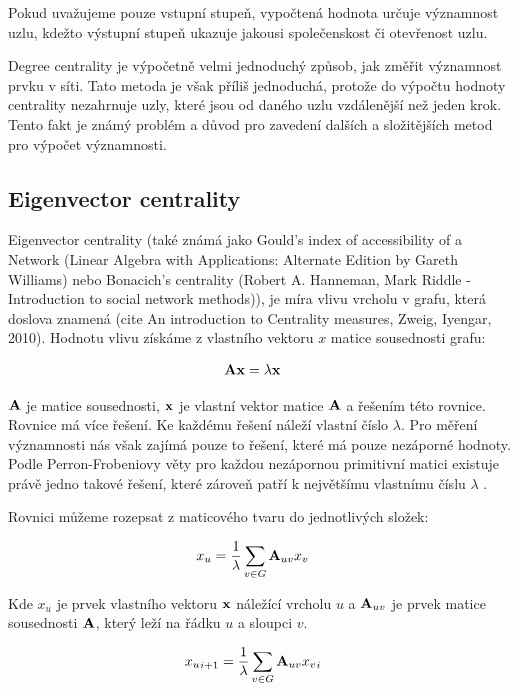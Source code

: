 \documentclass{bakalarka}
\begin{document}
Pokud uvažujeme pouze vstupní stupeň, vypočtená hodnota určuje významnost uzlu,
kdežto výstupní stupeň ukazuje jakousi společenskost či otevřenost uzlu. 

Degree centrality je výpočetně velmi jednoduchý způsob, jak změřit významnost
prvku v síti. Tato metoda je však příliš jednoduchá, protože do výpočtu hodnoty
centrality nezahrnuje uzly, které jsou od daného uzlu vzdálenější než jeden
krok. Tento fakt je známý problém a důvod pro zavedení dalších a složitějších
metod pro výpočet významnosti.



\subsection{Eigenvector centrality}
Eigenvector centrality (také známá jako Gould's index of accessibility of a
Network (Linear Algebra with Applications: Alternate Edition by Gareth
Williams) nebo Bonacich's centrality (Robert A. Hanneman, Mark Riddle -
Introduction to social network methods)), je míra vlivu vrcholu v grafu, která
doslova znamená  (cite An introduction to
Centrality measures, Zweig, Iyengar, 2010). Hodnotu vlivu získáme z vlastního
vektoru $x$ matice sousednosti grafu:

\begin{align}
{\bf Ax} &= \lambda {\bf x}
\end{align}

${\bf A}$ je matice sousednosti, ${\bf x}$ je vlastní vektor matice ${\bf A}$ a
řešením této rovnice. Rovnice má více řešení. Ke každému řešení náleží vlastní
číslo $\lambda$. Pro měření významnosti nás však zajímá pouze to řešení, které
má pouze nezáporné hodnoty. Podle Perron-Frobeniovy věty pro každou nezápornou
primitivní matici existuje právě jedno takové řešení, které zároveň patří k
největšímu vlastnímu číslu $\lambda$ \cite{langvillemeyer}.

Rovnici můžeme rozepsat z maticového tvaru do jednotlivých složek:

\begin{align} 
x_u &=  \frac{1}{\lambda} \displaystyle\sum_{v \in G} {\bf A}_{uv} x_v 
\end{align} 

Kde $x_u$ je prvek vlastního vektoru ${\bf x}$
náležící vrcholu $u$ a ${\bf A}_{uv}$ je prvek matice sousednosti ${\bf A}$,
který leží na řádku $u$ a sloupci $v$.

\begin{align} 
{x_u}_{i + 1} &=  \frac{1}{\lambda} \displaystyle\sum_{v \in G} {\bf A}_{uv}
{x_v}_{i}
\end{align} 
\end{document}
